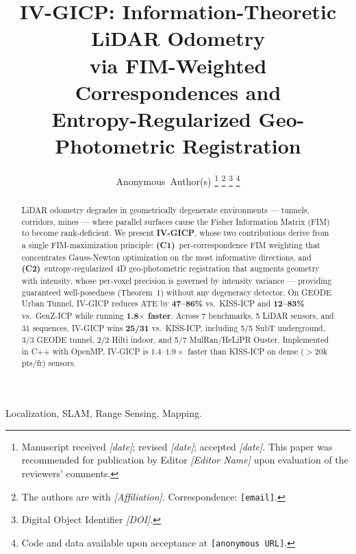\documentclass[journal,letterpaper,10pt]{IEEEtran}
\begin{document}
\title{IV-GICP: Information-Theoretic LiDAR Odometry\\
       via FIM-Weighted Correspondences and\\
       Entropy-Regularized Geo-Photometric Registration}

\author{Anonymous~Author(s)
\thanks{Manuscript received \textit{[date]}; revised \textit{[date]}; accepted \textit{[date]}.
This paper was recommended for publication by Editor \textit{[Editor Name]} upon evaluation of the reviewers' comments.}%
\thanks{The authors are with \textit{[Affiliation]}.
Correspondence: \texttt{[email]}.}%
\thanks{Digital Object Identifier \textit{[DOI]}.}%
\thanks{Code and data available upon acceptance at \texttt{[anonymous URL]}.}}

\maketitle

\begin{abstract}
LiDAR odometry degrades in geometrically degenerate environments
--- tunnels, corridors, mines --- where parallel surfaces cause the
Fisher Information Matrix (FIM) to become rank-deficient.
We present \textbf{IV-GICP}, whose two contributions derive from a
single FIM-maximization principle:
\textbf{(C1)}~per-correspondence FIM weighting that concentrates
Gauss-Newton optimization on the most informative directions, and
\textbf{(C2)}~entropy-regularized 4D geo-photometric registration
that augments geometry with intensity, whose per-voxel precision is
governed by intensity variance --- providing guaranteed
well-posedness (Theorem~1) without any degeneracy detector.
On GEODE Urban Tunnel, IV-GICP reduces ATE by
\textbf{47--86\%} vs.\ KISS-ICP and \textbf{12--83\%} vs.\ GenZ-ICP
while running \textbf{1.8$\times$ faster}.
Across 7 benchmarks, 5 LiDAR sensors, and 31 sequences, IV-GICP
wins \textbf{25/31} vs.\ KISS-ICP, including 5/5 SubT underground,
3/3 GEODE tunnel, 2/2 Hilti indoor, and 5/7 MulRan/HeLiPR Ouster.
Implemented in C++ with OpenMP, IV-GICP is $1.4$--$1.9\times$
faster than KISS-ICP on dense ($>$20k pts/fr) sensors.
\end{abstract}

\begin{IEEEkeywords}
Localization, SLAM, Range Sensing, Mapping.
\end{IEEEkeywords}

\end{document}
